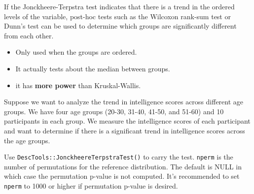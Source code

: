\documentclass[
]{ctexart}
\providecommand{\tightlist}{%
  \setlength{\itemsep}{0pt}\setlength{\parskip}{0pt}}
\begin{document}
If the Jonckheere-Terpstra test indicates that there is a trend in the
ordered levels of the variable, post-hoc tests such as the Wilcoxon
rank-sum test or Dunn's test can be used to determine which groups are
significantly different from each other.

\begin{itemize}
\tightlist
\item
  Only used when the groups are ordered.
\item
  It actually tests about the median between groups.
\item
  it has \textbf{more power} than Kruskal-Wallis.
\end{itemize}

Suppose we want to analyze the trend in intelligence scores across
different age groups. We have four age groups (20-30, 31-40, 41-50, and
51-60) and 10 participants in each group. We measure the intelligence
scores of each participant and want to determine if there is a
significant trend in intelligence scores across the age groups.

Use \texttt{DescTools::JonckheereTerpstraTest()} to carry the test.
\texttt{nperm} is the number of permutations for the reference
distribution. The default is NULL in which case the permutation p-value
is not computed. It's recommended to set \texttt{nperm} to 1000 or
higher if permutation p-value is desired.
\end{document}
